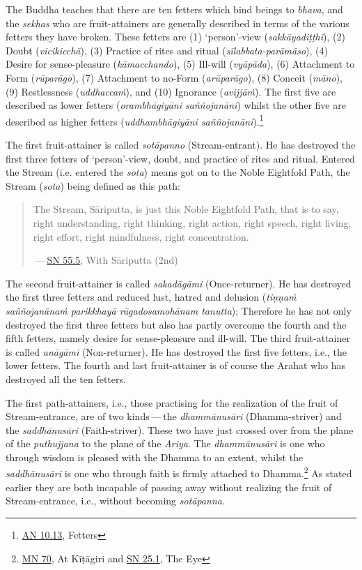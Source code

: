 The Buddha teaches that there are ten fetters which bind beings to \emph{bhava}, and the \emph{sekhas} who are fruit-attainers are generally described in terms of the various fetters they have broken. These fetters are (1) `person'-view (\emph{sakkāyadiṭṭhi}), (2) Doubt (\emph{vicikicchā}), (3) Practice of rites and ritual (\emph{sīlabbata-parāmāso}), (4) Desire for sense-pleasure (\emph{kāmacchando}), (5) Ill-will (\emph{vyāpāda}), (6) Attachment to Form (\emph{rūparāgo}), (7) Attachment to no-Form (\emph{arūparāgo}), (8) Conceit (\emph{māno}), (9) Restlessness (\emph{uddhaccaṁ}), and (10) Ignorance (\emph{avijjāṁ}). The first five are described as lower fetters (\emph{orambhāgiyāni saññojanāni}) whilst the other five are described as higher fetters (\emph{uddhambhāgiyāni saññojanāni}).\footnote{\href{https://suttacentral.net/an10.13/en/bodhi}{AN 10.13}, Fetters}

The first fruit-attainer is called \emph{sotāpanno} (Stream-entrant). He has destroyed the first three fetters of `person'-view, doubt, and practice of rites and ritual. Entered the Stream (i.e. entered the \emph{sota}) means got on to the Noble Eightfold Path, the Stream (\emph{sota}) being defined as this path:

\begin{quote}
The Stream, Sāriputta, is just this Noble Eightfold Path, that is to say, right understanding, right thinking, right action, right speech, right living, right effort, right mindfulness, right concentration.

 --- \href{https://suttacentral.net/sn55.5/en/sujato}{SN 55.5}, With Sāriputta (2nd)
\end{quote}

The second fruit-attainer is called \emph{sakadāgāmi} (Once-returner). He has destroyed the first three fetters and reduced lust, hatred and delusion (\emph{tiṇṇaṁ saññojanānaṁ parikkhayā rāgadosamohānam tanutta}); Therefore he has not only destroyed the first three fetters but also has partly overcome the fourth and the fifth fetters, namely desire for sense-pleasure and ill-will. The third fruit-attainer is called \emph{anāgāmi} (Non-returner). He has destroyed the first five fetters, i.e., the lower fetters. The fourth and last fruit-attainer is of course the Arahat who has destroyed all the ten fetters.

The first path-attainers, i.e., those practising for the realization of the fruit of Stream-entrance, are of two kinds --- the \emph{dhammānusāri} (Dhamma-striver) and the \emph{saddhānusāri} (Faith-striver). These two have just crossed over from the plane of the \emph{puthujjana} to the plane of the \emph{Ariya}. The \emph{dhammānusāri} is one who through wisdom is pleased with the Dhamma to an extent, whilst the \emph{saddhānusāri} is one who through faith is firmly attached to Dhamma.\footnote{\href{https://suttacentral.net/mn70/en/bodhi}{MN 70}, At Kīṭāgiri and \href{https://suttacentral.net/sn25.1/en/sujato}{SN 25.1}, The Eye} As stated earlier they are both incapable of passing away without realizing the fruit of Stream-entrance, i.e., without becoming \emph{sotāpanna}.

